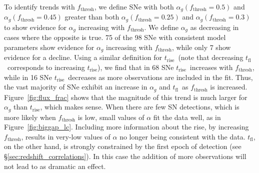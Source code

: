 \documentclass[twocolumn]{./aastex63}
\newcommand{\tfl}{$t_\mathrm{fl}$}
\newcommand{\trise}{$t_\mathrm{rise}$}
\begin{document}
To identify trends with $f_\mathrm{thresh}$, we define SNe with both
$\alpha_g(f_\mathrm{thresh} = 0.5)$ and $\alpha_g(f_\mathrm{thresh} = 0.45)$
greater than both $\alpha_g(f_\mathrm{thresh} = 0.25)$ and
$\alpha_g(f_\mathrm{thresh} = 0.3)$ to show evidence for $\alpha_g$ increasing
with $f_\mathrm{thresh}$. We define $\alpha_g$ as decreasing in cases where the
opposite is true. 75 of the 98 SNe with consistent model parameters show
evidence for $\alpha_g$ increasing with $f_\mathrm{thresh}$, while only 7 show
evidence for a decline. Using a similar definition for \trise\ (note that
decreasing \tfl\ corresponds to increasing \trise), we find that in 68 SNe
\trise\ increases with $f_\mathrm{thresh}$, while in 16 SNe \trise\ decreases as
more observations are included in the fit. Thus, the vast majority of SNe
exhibit an increase in $\alpha_g$ and \tfl\ as $f_\mathrm{thresh}$ is increased.
Figure~\ref{fig:flux_frac} shows that the magnitude of this trend is much larger
for $\alpha_g$ than \trise, which makes sense. When there are few SN detections,
which is more likely when $f_\mathrm{thresh}$ is low, small values of $\alpha$
fit the data well, as in Figure~\ref{fig:biggap_lc}. Including more information
about the rise, by increasing $f_\mathrm{thresh}$, results in very-low values of
$\alpha$ no longer being consistent with the data. \tfl, on the other hand, is
strongly constrained by the first epoch of detection (see
\S\ref{sec:redshift_correlations}). In this case the addition of more
observations will not lead to as dramatic an effect.





\end{document}
